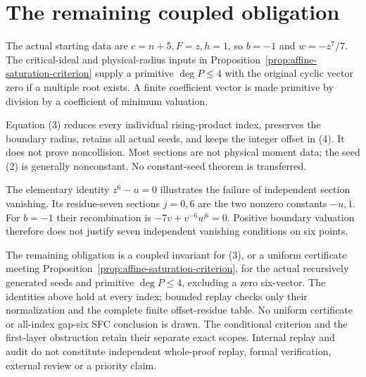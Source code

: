 \documentclass[11pt]{article}
\begin{document}
\section*{The remaining coupled obligation}
The actual starting data are $c=n+5,F=z,h=1$, so $b=-1$ and
$w=-z^7/7$. The critical-ideal and physical-radius inputs in
Proposition~\ref{prop:affine-saturation-criterion} supply a primitive
$\deg P\le4$ with the original cyclic vector zero if a multiple
root exists. A finite coefficient vector is made primitive by
division by a coefficient of minimum valuation.

Equation (3) reduces every individual rising-product index, preserves
the boundary radius, retains all actual seeds, and keeps the
integer offset in (4). It does not prove noncollision.
Most sections are not physical moment data; the seed (2) is
generally nonconstant. No constant-seed theorem is transferred.

The elementary identity $z^6-u=0$ illustrates the failure of
independent section vanishing. Its residue-seven sections $j=0,6$
are the two nonzero constants $-u,1$.
For $b=-1$ their recombination is
$-7v+v^{-6}w^6=0$.
Positive boundary valuation therefore does not justify seven
independent vanishing conditions on six points.

The remaining obligation is a coupled invariant for (3), or a
uniform certificate meeting Proposition~\ref{prop:affine-saturation-criterion},
for the
actual recursively generated seeds and primitive $\deg P\le4$,
excluding a zero six-vector. The identities above hold at every
index; bounded replay checks only their normalization and the
complete finite offset-residue table. No uniform certificate or all-index gap-six SFC conclusion
is drawn. The conditional criterion and the first-layer obstruction
retain their separate exact scopes. Internal replay and audit do not
constitute independent whole-proof replay, formal verification,
external review or a priority claim.
\end{document}
